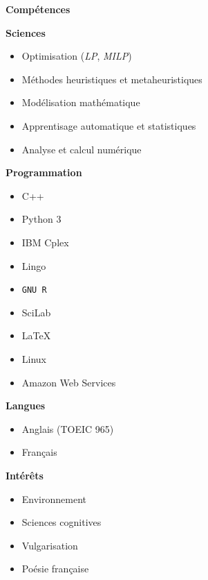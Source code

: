 \documentclass[11.5pt]{article}
\newlength\cvRightWidth
\newcommand\cvSection[1]{
    \begin{mdframed}[
        linewidth=.5pt,
        topline=false,
        leftline=false,
        rightline=false,
        linecolor=red!60!black,
        innermargin=0,
        outermargin=0
    ]
        \begin{Large}
            \textbf{#1}
        \end{Large}
    \end{mdframed}
}
\begin{document}
\begin{minipage}[t]{\textwidth}
\begin{minipage}[t]{\cvRightWidth}
{            }
            \cvSection{Compétences}
            \textbf{Sciences}
                \vspace{10pt}
                \begin{itemize}
                    \item Optimisation {\small (\emph{LP}, \emph{MILP})}
                    \item Méthodes heuristiques et metaheuristiques
                    \item Modélisation mathématique
                    \item Apprentisage automatique et statistiques
                    \item Analyse et calcul numérique
                \end{itemize}
                \vspace{10pt}
            \textbf{Programmation}
            \begin{multicols}{2}
                \begin{itemize}
                    \item C++
                    \item Python 3
                    \item IBM Cplex
                    \item Lingo
                    \item\texttt{GNU R}
                    \item SciLab
                    \item\LaTeX
                    \item Linux
                    \item Amazon Web Services
                \end{itemize}
            \end{multicols}
            \textbf{Langues}
            \begin{multicols}{2}
                \begin{itemize}
                    \item Anglais {\footnotesize(TOEIC 965)}
                    \item Français
                \end{itemize}
            \end{multicols}
            \textbf{Intérêts}
            \begin{multicols}{2}
                \begin{itemize}
                    \item Environnement
                    \item Sciences cognitives
                    \item Vulgarisation
                    \item Poésie française
                \end{itemize}
            \end{multicols}
        \end{minipage}
    \end{minipage}
\end{document}
